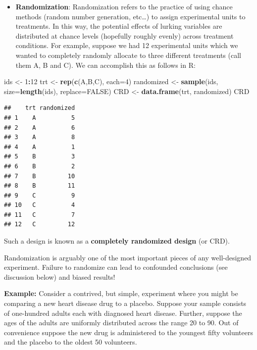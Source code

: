 \documentclass[
]{book}
\newenvironment{Shaded}{\begin{snugshade}}{\end{snugshade}}
\newcommand{\AttributeTok}[1]{\textcolor[rgb]{0.13,0.29,0.53}{#1}}
\newcommand{\ConstantTok}[1]{\textcolor[rgb]{0.56,0.35,0.01}{#1}}
\newcommand{\DecValTok}[1]{\textcolor[rgb]{0.00,0.00,0.81}{#1}}
\newcommand{\FunctionTok}[1]{\textcolor[rgb]{0.13,0.29,0.53}{\textbf{#1}}}
\newcommand{\NormalTok}[1]{#1}
\newcommand{\OtherTok}[1]{\textcolor[rgb]{0.56,0.35,0.01}{#1}}
\newcommand{\SpecialCharTok}[1]{\textcolor[rgb]{0.81,0.36,0.00}{\textbf{#1}}}
\newcommand{\StringTok}[1]{\textcolor[rgb]{0.31,0.60,0.02}{#1}}
\begin{document}
\begin{itemize}
\item
  \textbf{Randomization}: Randomization refers to the practice of using chance methods (random number generation, etc\ldots) to assign experimental units to treatments. In this way, the potential effects of lurking variables are distributed at chance levels (hopefully roughly evenly) across treatment conditions. For example, suppose we had 12 experimental units which we wanted to completely randomly allocate to three different treatments (call them A, B and C). We can accomplish this as follows in R:
\end{itemize}

\begin{Shaded}
\begin{Highlighting}[]
\NormalTok{ids }\OtherTok{\textless{}{-}} \DecValTok{1}\SpecialCharTok{:}\DecValTok{12}
\NormalTok{trt }\OtherTok{\textless{}{-}} \FunctionTok{rep}\NormalTok{(}\FunctionTok{c}\NormalTok{(}\StringTok{\textquotesingle{}A\textquotesingle{}}\NormalTok{,}\StringTok{\textquotesingle{}B\textquotesingle{}}\NormalTok{,}\StringTok{\textquotesingle{}C\textquotesingle{}}\NormalTok{), }\AttributeTok{each=}\DecValTok{4}\NormalTok{)}
\NormalTok{randomized }\OtherTok{\textless{}{-}} \FunctionTok{sample}\NormalTok{(ids, }\AttributeTok{size=}\FunctionTok{length}\NormalTok{(ids), }\AttributeTok{replace=}\ConstantTok{FALSE}\NormalTok{)}
\NormalTok{CRD }\OtherTok{\textless{}{-}} \FunctionTok{data.frame}\NormalTok{(trt, randomized)}
\NormalTok{CRD}
\end{Highlighting}
\end{Shaded}

\begin{verbatim}
##    trt randomized
## 1    A          5
## 2    A          6
## 3    A          8
## 4    A          1
## 5    B          3
## 6    B          2
## 7    B         10
## 8    B         11
## 9    C          9
## 10   C          4
## 11   C          7
## 12   C         12
\end{verbatim}

Such a design is known as a \textbf{completely randomized design} (or CRD).

Randomization is arguably one of the most important pieces of any well-designed experiment.
Failure to randomize can lead to confounded conclusions (see discussion below) and biased results!

\textbf{Example:} Consider a contrived, but simple, experiment where you might be comparing a new heart disease drug to a placebo.
Suppose your sample consists of one-hundred adults each with diagnosed heart disease.
Further, suppose the ages of the adults are uniformly distributed across the range 20 to 90.
Out of convenience suppose the new drug is administered to the youngest fifty volunteers and the placebo to the oldest 50 volunteers.
\end{document}
